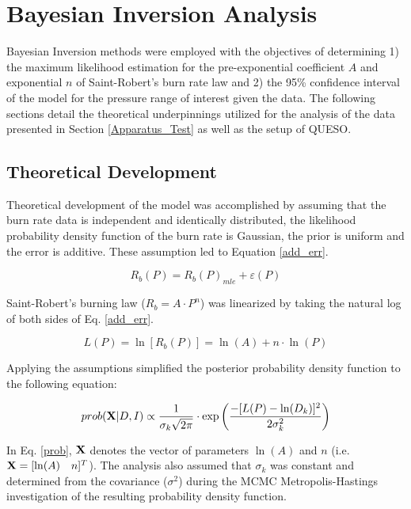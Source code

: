 \documentclass{article}
\begin{document}
\section{Bayesian Inversion Analysis} \label{Bayesian_Inv_Analysis}

Bayesian Inversion methods were employed with the objectives of determining 1) the maximum likelihood estimation for
the pre-exponential coefficient $A$ and exponential $n$ of Saint-Robert's burn rate law and 2) the 95\% confidence interval 
of the model for the pressure range of interest given the data. The following sections detail the theoretical 
underpinnings utilized for the analysis of the data presented in Section \ref{Apparatus_Test} as well as the setup of QUESO.

\subsection{Theoretical Development} \label{Theory_Dev}

Theoretical development of the model was accomplished by assuming that the burn rate data is independent and 
identically distributed, the likelihood probability density function of the burn rate is Gaussian, the prior 
is uniform and the error is additive. These assumption led to Equation \ref{add_err}. 

\begin{equation} \label{add_err}
R_b (P)=R_b (P)_{mle} + \varepsilon (P)
\end{equation}

Saint-Robert's burning law ($R_b=A \cdot P^n$) was linearized by taking the natural log of both sides of Eq. \ref{add_err}.

\begin{equation} \label{ln_st_rob}
L(P) = \ln [R_b(P)] = \ln (A) + n \cdot \ln (P)
\end{equation}

Applying the assumptions simplified the posterior probability density function to the following equation:

\begin{equation} \label{prob}
prob( \mathbf{X} |D, I) \propto \frac{1}{\sigma_k \sqrt{2 \pi} } \cdot \exp{\bigg( \frac{-[L(P)-\ln(D_k)]^2}{2\sigma_k^2} \bigg)}
\end{equation}

In Eq. \ref{prob}, $\mathbf{X}$ denotes the vector of parameters $\ln(A)$ and $n$ (i.e. $\mathbf{X}=[\ln(A) \quad n]^T$). 
The analysis also assumed that $\sigma_k$ was constant and determined from the covariance ($\sigma^2$) during the MCMC 
Metropolis-Hastings investigation of the resulting probability density function.
\end{document}

